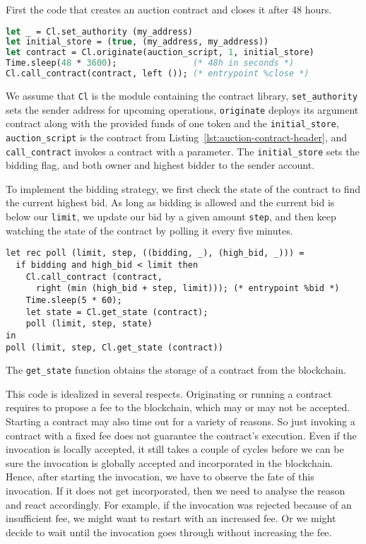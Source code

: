 \documentclass[a4paper]{llncs}
\begin{document}
First the code that creates an auction contract and closes it after 48 hours. 
\begin{lstlisting}[language=Caml,numbers=none,basicstyle=\small]
let _ = Cl.set_authority (my_address)
let initial_store = (true, (my_address, my_address))
let contract = Cl.originate(auction_script, 1, initial_store)
Time.sleep(48 * 3600);               (* 48h in seconds *)
Cl.call_contract(contract, left ()); (* entrypoint %close *)
\end{lstlisting}
We assume that \lstinline/Cl/ is the module containing the contract
library, \lstinline{set_authority} sets the sender address for
upcoming operations,  \lstinline/originate/ deploys its argument contract along
with the provided funds of one token and the \lstinline/initial_store/, 
\lstinline{auction_script} is the contract from Listing~\ref{lst:auction-contract-header}, and 
\lstinline{call_contract} invokes a contract with a parameter. The
\lstinline{initial_store} sets the bidding flag, and both owner and
highest bidder to the sender account.


To implement the bidding strategy, we first check the state of the
contract to find the current highest bid. As long as bidding is
allowed and the current bid is below our \lstinline/limit/, we update
our bid by a given amount \lstinline/step/, and then keep watching the state of the contract by
polling it every five minutes. 
\begin{lstlisting}[numbers=none,basicstyle=\small]
let rec poll (limit, step, ((bidding, _), (high_bid, _))) =
  if bidding and high_bid < limit then
    Cl.call_contract (contract, 
      right (min (high_bid + step, limit))); (* entrypoint %bid *)
    Time.sleep(5 * 60);
    let state = Cl.get_state (contract);
    poll (limit, step, state)
in
poll (limit, step, Cl.get_state (contract))
\end{lstlisting}
The \lstinline{get_state} function obtains the storage of a contract from
the blockchain.

This code is idealized in several respects. Originating or running a contract
requires to propose a fee to the blockchain, which may or may not be
accepted.
Starting a contract may also time out for a variety of reasons. So just
invoking a contract with a fixed fee does not guarantee the contract's
execution.  Even if the invocation is locally accepted, it still takes
a couple of cycles before we can be sure the invocation is globally
accepted and incorporated in the blockchain.
Hence, after starting the invocation, we have to observe the fate of
this invocation. If it does not get incorporated, then we need to
analyse the reason and react accordingly. For example, if the
invocation was rejected because of an insufficient fee, we might want
to restart with an increased fee. Or we might decide to wait until the
invocation goes through without increasing the fee.
\end{document}

